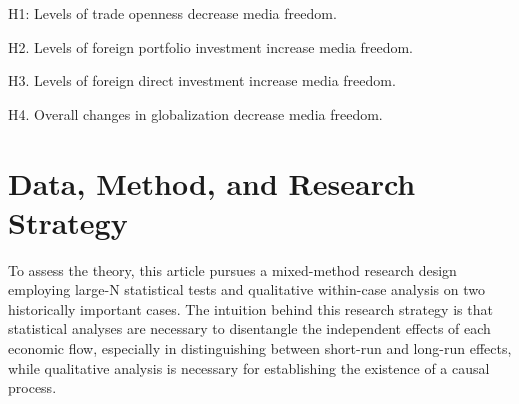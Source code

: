 \documentclass[12pt,a4paper]{article}\usepackage[]{graphicx}\usepackage[]{color}
\begin{document}
H1: Levels of trade openness decrease media freedom.

H2. Levels of foreign portfolio investment increase media freedom.

H3. Levels of foreign direct investment increase media freedom.

H4. Overall changes in globalization decrease media freedom.

\section{Data, Method, and Research Strategy}

To assess the theory, this article pursues a mixed-method research design employing large-N statistical tests and qualitative within-case analysis on two historically important cases. The intuition behind this research strategy is that statistical analyses are necessary to disentangle the independent effects of each economic flow, especially in distinguishing between short-run and long-run effects, while qualitative analysis is necessary for establishing the existence of a causal process.
\end{document}
